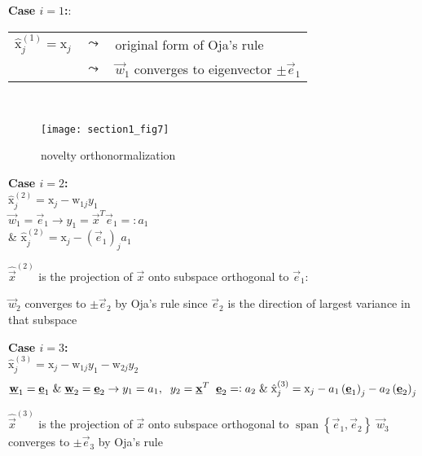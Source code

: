 \textbf{Case $i=1$:}:\\
\begin{tabular}{lll}
			$\hat{\mathrm{x}}_j^{(1)} = \mathrm{x}_j$ & $\leadsto$ & original form of Oja's rule \\
								                      & $\leadsto$ & $\vec{w}_1$ converges to eigenvector $\pm \vec{e}_1$
\end{tabular}\\
\vspace{0.3cm}
\begin{wrapfigure}{r}{0.5\textwidth}
  \begin{center}
    \texttt{[image: section1\_fig7]}
  \end{center}
  \caption{novelty orthonormalization}
\end{wrapfigure}
\textbf{Case $i=2$:}\\
		$\hat{\mathrm{x}}_j^{(2)} = \mathrm{x}_j - \mathrm{w}_{1j} y_1$ \\
		$\vec{w}_1 = \vec{e}_1 \rightarrow y_1 = \vec{x}^T \vec{e}_1 =: a_1$ \\ \& $\hat{\mathrm{x}}_j^{(2)} = \mathrm{x}_j - \left( \vec{e}_1 \right)_j a_1$\\
\begin{itemize}
	\itr $\hat{\vec{x}}^{(2)}$ is the projection of $\vec{x}$ onto subspace orthogonal to $\vec{e}_1$:
	\begin{itemize}
	\itr $\vec{w}_2$ converges to $\pm \vec{e}_2$ by Oja's rule since $\vec{e}_2$ is the direction of largest variance in that subspace
	\end{itemize}
\end{itemize}
\vspace{0.7cm}
\textbf{Case $i=3$:}\\
$\hat{\mathrm{x}}_j^{(3)} = \mathrm{x}_j - \mathrm{w}_{1j} y_1 - \mathrm{w}_{2j} y_2$ \\ 
$$\vec{w}_1 = \vec{e}_1 \hspace{0.1cm} \& \hspace{0.1cm} \vec{w}_2 = \vec{e}_2 \rightarrow y_1 = a_1, \hspace{0.2cm} y_2 = \vec{x}^T \hspace{0.2cm} \vec{e}_2 =: a_2\\ 
\hspace{0.1cm} \& \hspace{0.1cm}\hat{\mathrm{x}}_j^{(3)} = \mathrm{x}_j - a_1 \left( \vec{e}_1 \right)_j - a_2 \left( \vec{e}_2 \right)_j$$
\begin{itemize}
\itr $\hat{\vec{x}}^{(3)}$ is the projection of $\vec{x}$ onto subspace orthogonal to $\operatorname{span}\left\{ \vec{e}_1, \vec{e}_2 \right\}$
\itr $\vec{w}_3$ converges to $\pm \vec{e}_3$ by Oja's rule\\
\end{itemize}
